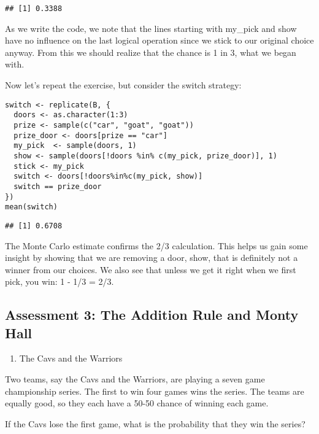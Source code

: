\documentclass[
]{article}
\providecommand{\tightlist}{%
  \setlength{\itemsep}{0pt}\setlength{\parskip}{0pt}}
\begin{document}
\begin{verbatim}
## [1] 0.3388
\end{verbatim}

As we write the code, we note that the lines starting with my\_pick and
show have no influence on the last logical operation since we stick to
our original choice anyway. From this we should realize that the chance
is 1 in 3, what we began with.

Now let's repeat the exercise, but consider the switch strategy:

\begin{verbatim}
switch <- replicate(B, {
  doors <- as.character(1:3)
  prize <- sample(c("car", "goat", "goat"))
  prize_door <- doors[prize == "car"]
  my_pick  <- sample(doors, 1)
  show <- sample(doors[!doors %in% c(my_pick, prize_door)], 1)
  stick <- my_pick
  switch <- doors[!doors%in%c(my_pick, show)]
  switch == prize_door
})
mean(switch)
\end{verbatim}

\begin{verbatim}
## [1] 0.6708
\end{verbatim}

The Monte Carlo estimate confirms the 2/3 calculation. This helps us
gain some insight by showing that we are removing a door, show, that is
definitely not a winner from our choices. We also see that unless we get
it right when we first pick, you win: 1 - 1/3 = 2/3.

\hypertarget{assessment-3-the-addition-rule-and-monty-hall}{%
\subsection{Assessment 3: The Addition Rule and Monty
Hall}\label{assessment-3-the-addition-rule-and-monty-hall}}

\begin{enumerate}
\def\labelenumi{\arabic{enumi}.}
\tightlist
\item
  The Cavs and the Warriors
\end{enumerate}

Two teams, say the Cavs and the Warriors, are playing a seven game
championship series. The first to win four games wins the series. The
teams are equally good, so they each have a 50-50 chance of winning each
game.

If the Cavs lose the first game, what is the probability that they win
the series?
\end{document}
